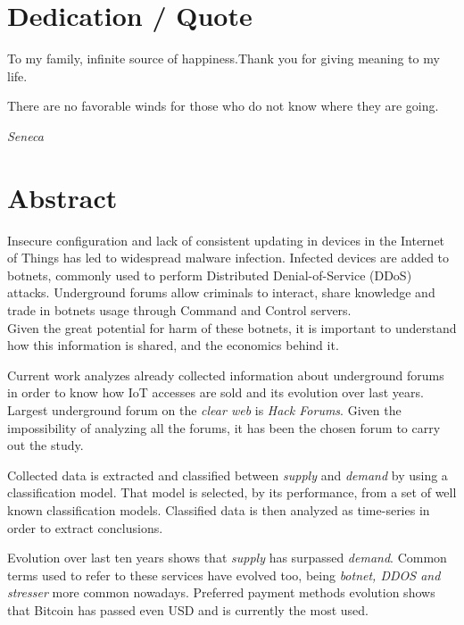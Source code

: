 \chapter*{Dedication / Quote}

To my family, infinite source of happiness.{\newline}Thank you for giving meaning to my life.

\vspace{6cm}

\epigraph{There are no favorable winds for those who do not know where they are going.}{\textit{Seneca}}

\chapter*{Abstract}

\onehalfspacing

Insecure configuration and lack of consistent updating in devices in the Internet of Things has led to widespread malware infection. Infected devices are added to botnets, commonly used to perform Distributed Denial-of-Service (DDoS) attacks. Underground forums allow criminals to interact, share knowledge and trade in botnets usage through Command and Control servers. \\
Given the great potential for harm of these botnets, it is important to understand how this information is shared, and the economics behind it.

Current work analyzes already collected information about underground forums in order to know how IoT accesses are sold and its evolution over last years. \\ 
Largest underground forum on the \textit{clear web} is \textit{Hack Forums}. Given the impossibility of analyzing all the forums, it has been the chosen forum to carry out the study.

Collected data is extracted and classified between \textit{supply} and \textit{demand} by using a classification model. That model is selected, by its performance, from a set of well known classification models. Classified data is then analyzed as time-series in order to extract conclusions.

Evolution over last ten years shows that \textit{supply} has surpassed \textit{demand}. Common terms used to refer to these services have evolved too, being \textit{botnet, DDOS and stresser} more common nowadays. Preferred payment methods evolution shows that Bitcoin has passed even USD and is currently the most used.


